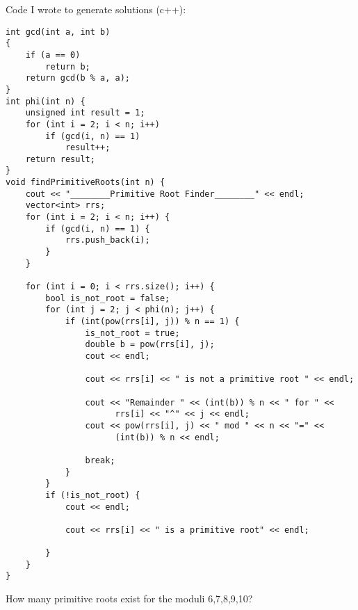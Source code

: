 \documentclass[11pt]{article}
\theoremstyle{definition}  %
\newcommand{\block}[2]{\begin{tcolorbox}[title={#1}]{#2}\end{tcolorbox}}
\begin{document}
Code I wrote to generate solutions (c++):
\begin{lstlisting}
int gcd(int a, int b)
{
	if (a == 0)
		return b;
	return gcd(b % a, a);
}
int phi(int n) {
	unsigned int result = 1;
	for (int i = 2; i < n; i++)
		if (gcd(i, n) == 1)
			result++;
	return result;
}
void findPrimitiveRoots(int n) {
	cout << "________Primitive Root Finder________" << endl;
	vector<int> rrs;
	for (int i = 2; i < n; i++) {
		if (gcd(i, n) == 1) {
			rrs.push_back(i);
		}
	}

	for (int i = 0; i < rrs.size(); i++) {
		bool is_not_root = false;
		for (int j = 2; j < phi(n); j++) {
			if (int(pow(rrs[i], j)) % n == 1) {
				is_not_root = true;
				double b = pow(rrs[i], j);
				cout << endl;

				cout << rrs[i] << " is not a primitive root " << endl;

				cout << "Remainder " << (int(b)) % n << " for " <<
                      rrs[i] << "^" << j << endl;
				cout << pow(rrs[i], j) << " mod " << n << "=" <<
                      (int(b)) % n << endl;

				break;
			}
		}
		if (!is_not_root) {
			cout << endl;

			cout << rrs[i] << " is a primitive root" << endl;

		}
	}
}
\end{lstlisting}
\block{Question #4: Andrews 7.2.15}{
How many primitive roots exist for the moduli 6,7,8,9,10?
}
\end{document}
